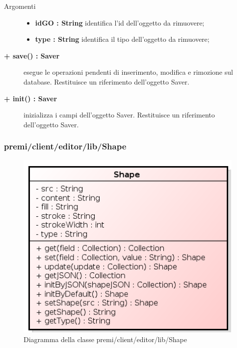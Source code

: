 \begin{description}
\begin{description}
		\begin{description}
			\item[Argomenti] \hfill
				\begin{itemize}
				
					\item \textbf{idGO : String			} \hfill
					identifica l'id dell'oggetto da rimuovere;
					\item \textbf{type : String			} \hfill
					identifica il tipo dell'oggetto da rimuovere;
				\end{itemize}
		\end{description}
	\end{description}
	
		\begin{description}
		\item[\textbf{\color{blue}+ save() : Saver			}] \hfill
			esegue le operazioni pendenti di inserimento, modifica e rimozione sul database. Restituisce un riferimento dell'oggetto Saver.
		\end{description}

		\begin{description}
		\item[\textbf{\color{blue}+ init() : Saver			}] \hfill
			inizializza i campi dell'oggetto Saver. Restituisce un riferimento dell'oggetto Saver.
		\end{description}	
	
\end{description}


\subsubsection{premi/client/editor/lib/Shape}
\begin{figure}[h]
\begin{center}
\includegraphics[scale=0.40]{img/diacla/shape.png}
\caption{Diagramma della classe premi/client/editor/lib/Shape}
\end{center}
\end{figure}

